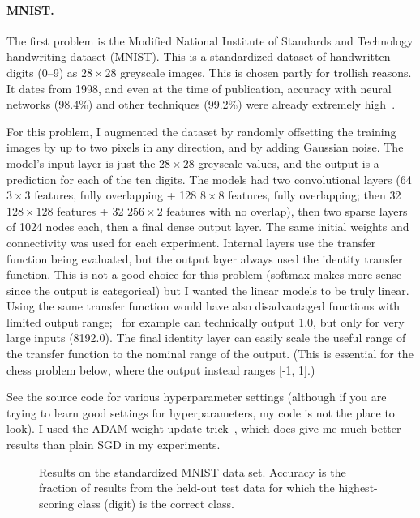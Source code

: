 \documentclass[twocolumn]{article}
\newcommand\xbyx[2]{\ensuremath{#1 {\times} #2}}
\begin{document}
\paragraph{MNIST.}
The first problem is the Modified National Institute of Standards and
Technology handwriting dataset (MNIST). This is a standardized dataset
of handwritten digits (0–9) as \xbyx{28}{28} greyscale images. This is chosen
partly for trollish reasons. It dates from 1998, and even at the time
of publication, accuracy with neural networks (98.4\%) and other
techniques (99.2\%) were already extremely high~\cite{lecun1998gradient}.

For this problem, I augmented the dataset by randomly offsetting the
training images by up to two pixels in any direction, and by adding
Gaussian noise. The model's input layer is just the $28 \times 28$
greyscale values, and the output is a prediction for each of the ten
digits. The models had two convolutional layers (64 \xbyx{3}{3} features,
fully overlapping + 128 \xbyx{8}{8} features, fully overlapping; then
32 \xbyx{128}{128} features + 32 \xbyx{256}{2} features with no
overlap), then two sparse layers of 1024 nodes each, then a final
dense output layer. The same initial weights and connectivity was used
for each experiment. Internal layers use the transfer function being
evaluated, but the output layer always used the identity transfer
function. This is not a good choice for this problem (softmax makes
more sense since the output is categorical) but I wanted the linear
models to be truly linear. Using the same transfer function would have
also disadvantaged functions with limited output range; \downshifttwo\
for example can technically output 1.0, but only for very large inputs
(8192.0). The final identity layer can easily scale the useful range
of the transfer function to the nominal range of the output. (This is
essential for the chess problem below, where the output instead ranges
[-1, 1].)

See the source code for various hyperparameter settings (although if
you are trying to learn good settings for hyperparameters, my code is
not the place to look). I used the ADAM weight update
trick~\cite{kingma2014adam}, which does give me much better results
than plain SGD in my experiments.

\begin{figure}[htp]
  \begin{center}
    
  \end{center}
  \caption{
    Results on the standardized MNIST data set. Accuracy is the
    fraction of results from the held-out test data for which the
    highest-scoring class (digit) is the correct class.
  } \label{fig:mnistresults}
\end{figure}
\end{document}
